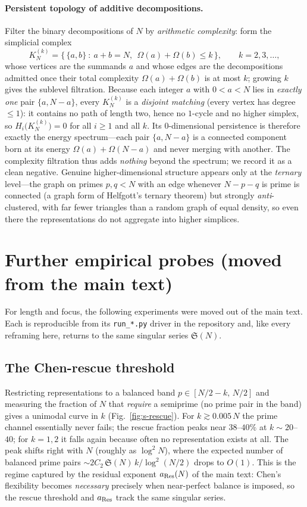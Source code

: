 \documentclass[11pt]{article}
\newcommand{\OmegaF}{\Omega}
\newcommand{\sing}{\mathfrak S}
\begin{document}
\paragraph{Persistent topology of additive decompositions.}
Filter the binary decompositions of $N$ by \emph{arithmetic complexity}: form the simplicial
complex
\[
  K_N^{(k)}=\big\{\,\{a,b\}\ :\ a+b=N,\ \ \OmegaF(a)+\OmegaF(b)\le k\,\big\},\qquad k=2,3,\dots,
\]
whose vertices are the summands $a$ and whose edges are the decompositions admitted once their
total complexity $\OmegaF(a)+\OmegaF(b)$ is at most $k$; growing $k$ gives the sublevel filtration.
Because each integer $a$ with $0<a<N$ lies in \emph{exactly one} pair $\{a,N-a\}$, every $K_N^{(k)}$
is a \emph{disjoint matching} (every vertex has degree $\le1$): it contains no path of length two,
hence no $1$-cycle and no higher simplex, so $H_i\big(K_N^{(k)}\big)=0$ for all $i\ge1$ and all $k$.
Its $0$-dimensional persistence is therefore exactly the energy spectrum---each pair $\{a,N-a\}$ is
a connected component born at its energy $\OmegaF(a)+\OmegaF(N-a)$ and never merging with another.
The complexity filtration thus adds \emph{nothing} beyond the spectrum; we record it as a clean
negative. Genuine higher-dimensional structure appears only at the \emph{ternary} level---the graph
on primes $p,q<N$ with an edge whenever $N-p-q$ is prime is connected (a graph form of Helfgott's
ternary theorem) but strongly \emph{anti}-clustered, with far fewer triangles than a random graph
of equal density, so even there the representations do not aggregate into higher simplices.

\section{Further empirical probes (moved from the main text)}
\label{sec:moved-probes}

For length and focus, the following experiments were moved out of the main text. Each is
reproducible from its \texttt{run\_*.py} driver in the repository and, like every reframing
here, returns to the same singular series $\sing(N)$.

\subsection{The Chen-rescue threshold}
\label{sec:moved-opt}

Restricting representations to a balanced band $p\in[N/2-k,\,N/2]$ and measuring the fraction
of $N$ that \emph{require} a semiprime (no prime pair in the band) gives a unimodal curve in
$k$ (Fig.~\ref{fig:s-rescue}). For $k\gtrsim0.005\,N$ the prime channel essentially never
fails; the rescue fraction peaks near $38$--$40\%$ at $k\sim20$--$40$; for $k=1,2$ it falls
again because often no representation exists at all. The peak shifts right with $N$ (roughly as
$\log^2N$), where the expected number of balanced prime pairs
$\sim2C_2\,\sing(N)\,k/\log^2(N/2)$ drops to $O(1)$. This is the regime captured by the
residual exponent $a_{\rm Res}(N)$ of the main text: Chen's flexibility becomes \emph{necessary}
precisely when near-perfect balance is imposed, so the rescue threshold and $a_{\rm Res}$ track
the same singular series.
\end{document}
